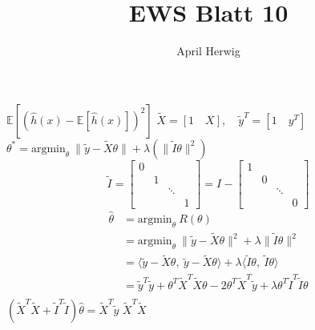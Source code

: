 \documentclass[draft]{article}
\title{EWS Blatt 10}
\author{April Herwig}
\begin{document}
\maketitle

$\mathbb{E}\left[ \left( \hat{h}(x) - \mathbb{E}\left[ \hat{h}(x) \right] \right) ^2 \right]$
$ \tilde{X} = [1\quad X], \quad\tilde{y}^T = [1\quad y^T] $
$ \theta ^{*} = \text{argmin}_\theta\  \| \tilde{y} - \tilde{X}\theta \| + \lambda\left(\| \tilde{I}\theta \|^2 \right)  $
\[
    \tilde{I}=\begin{bmatrix}
        0 & & & \\
        & 1 & & \\
        & & \ddots & \\
        & & & 1
    \end{bmatrix} = I - \begin{bmatrix}
        1 & & & \\
        & 0 & & \\
        & & \ddots & \\
        & & & 0 
    \end{bmatrix}
\]
\begin{align*}
    \hat{\theta} &= \text{argmin}_\theta\ R(\theta) \\
    &= \text{argmin}_\theta\ \| \tilde{y} - \tilde{X}\theta \|^2 + \lambda\| \tilde{I}\theta \| ^2 \\
    &= \langle \tilde{y} - \tilde{X}\theta,\ \tilde{y} - \tilde{X}\theta \rangle + \lambda\langle\tilde{I}\theta,\ \tilde{I}\theta\rangle \\
    &= \tilde{y}^T \tilde{y} +\theta^T\tilde{X}^T\tilde{X}\theta - 2\theta^T\tilde{X}^T\tilde{y} + \lambda\theta^T\tilde{I}^T\tilde{I}\theta \\
\end{align*}
$ \left(\tilde{X}^T\tilde{X} + \tilde{I}^T\tilde{I}\right)\hat{\theta} = \tilde{X}^T\tilde{y} $
$ \tilde{X}^T\tilde{X} $
\end{document}
